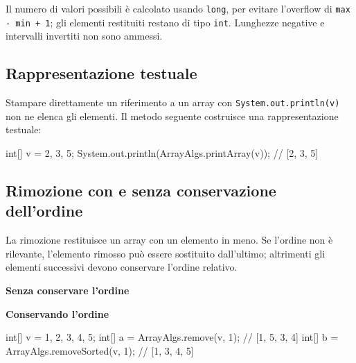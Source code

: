 

Il numero di valori possibili è calcolato usando \texttt{long},
per evitare l'overflow di \texttt{max - min + 1}; gli elementi
restituiti restano di tipo \texttt{int}. Lunghezze negative e
intervalli invertiti non sono ammessi.

\subsection{Rappresentazione testuale}
\label{sec:fi-java-array-stampa}

Stampare direttamente un riferimento a un array con
\texttt{System.out.println(v)} non ne elenca gli elementi.
Il metodo seguente costruisce una rappresentazione testuale:



\begin{unipdcode}[language=Java]
int[] v = {2, 3, 5};
System.out.println(ArrayAlgs.printArray(v)); // [2, 3, 5]
\end{unipdcode}

\clearpage

\subsection{Rimozione con e senza conservazione dell'ordine}
\label{sec:fi-java-array-remove}

La rimozione restituisce un array con un elemento in meno. Se l'ordine non è rilevante, l'elemento rimosso
può essere sostituito dall'ultimo; altrimenti gli elementi
successivi devono conservare l'ordine relativo.

\noindent
\begin{minipage}[t]{0.48\linewidth}
\vspace{0pt}
\textbf{Senza conservare l'ordine}


\end{minipage}%
\hfill
\begin{minipage}[t]{0.48\linewidth}
\vspace{0pt}
\textbf{Conservando l'ordine}


\end{minipage}

\begin{unipdcode}[language=Java]
int[] v = {1, 2, 3, 4, 5};
int[] a = ArrayAlgs.remove(v, 1);        // [1, 5, 3, 4]
int[] b = ArrayAlgs.removeSorted(v, 1);  // [1, 3, 4, 5]
\end{unipdcode}

